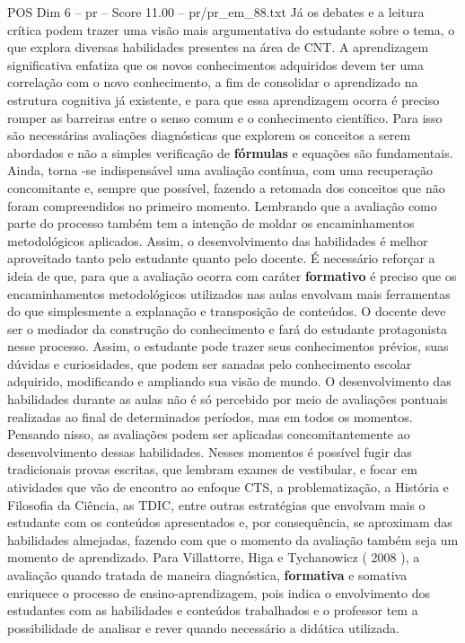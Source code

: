 \begin{textsample}{POS Dim 6 – pr – Score 11.00 – pr/pr\_em\_88.txt}
Já os debates e a leitura crítica podem trazer uma visão mais argumentativa do estudante sobre o tema, o que explora diversas habilidades presentes na área de CNT.
A aprendizagem significativa enfatiza que os novos conhecimentos adquiridos devem ter uma correlação com o novo conhecimento, a fim de consolidar o aprendizado na estrutura cognitiva já existente, e para que essa aprendizagem ocorra é preciso romper as barreiras entre o senso comum e o conhecimento científico.
Para isso são necessárias avaliações diagnósticas que explorem os conceitos a serem abordados e não a simples verificação de \textbf{fórmulas} e equações são fundamentais.
Ainda, torna -se indispensável uma avaliação contínua, com uma recuperação concomitante e, sempre que possível, fazendo a retomada dos conceitos que não foram compreendidos no primeiro momento.
Lembrando que a avaliação como parte do processo também tem a intenção de moldar os encaminhamentos metodológicos aplicados.
Assim, o desenvolvimento das habilidades é melhor aproveitado tanto pelo estudante quanto pelo docente.
É necessário reforçar a ideia de que, para que a avaliação ocorra com caráter \textbf{formativo} é preciso que os encaminhamentos metodológicos utilizados nas aulas envolvam mais ferramentas do que simplesmente a explanação e transposição de conteúdos.
O docente deve ser o mediador da construção do conhecimento e fará do estudante protagonista nesse processo.
Assim, o estudante pode trazer seus conhecimentos prévios, suas dúvidas e curiosidades, que podem ser sanadas pelo conhecimento escolar adquirido, modificando e ampliando sua visão de mundo.
O desenvolvimento das habilidades durante as aulas não é só percebido por meio de avaliações pontuais realizadas ao final de determinados períodos, mas em todos os momentos.
Pensando nisso, as avaliações podem ser aplicadas concomitantemente ao desenvolvimento dessas habilidades.
Nesses momentos é possível fugir das tradicionais provas escritas, que lembram exames de vestibular, e focar em atividades que vão de encontro ao enfoque CTS, a problematização, a História e Filosofia da Ciência, as TDIC, entre outras estratégias que envolvam mais o estudante com os conteúdos apresentados e, por consequência, se aproximam das habilidades almejadas, fazendo com que o momento da avaliação também seja um momento de aprendizado.
Para Villattorre, Higa e Tychanowicz ( 2008 ), a avaliação quando tratada de maneira diagnóstica, \textbf{formativa} e somativa enriquece o processo de ensino-aprendizagem, pois indica o envolvimento dos estudantes com as habilidades e conteúdos trabalhados e o professor tem a possibilidade de analisar e rever quando necessário a didática utilizada.

\end{textsample}
